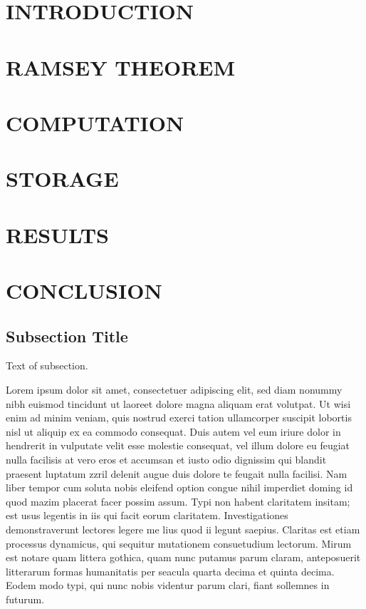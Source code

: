 \documentclass[12pt]{etsu_thesis}
\begin{document}
\listoffigures


\newpage
\section{INTRODUCTION}

\newpage
\section{RAMSEY THEOREM}

\newpage
\section{COMPUTATION}

\newpage
\section{STORAGE}

\newpage
\section{RESULTS}

\newpage
\section{CONCLUSION}


\subsection{Subsection Title}

Text of subsection.

Lorem ipsum dolor sit amet, consectetuer adipiscing elit, sed diam nonummy nibh euismod tincidunt ut laoreet dolore magna aliquam erat volutpat. Ut wisi enim ad minim veniam, quis nostrud exerci tation ullamcorper suscipit lobortis nisl ut aliquip ex ea commodo consequat. Duis autem vel eum iriure dolor in hendrerit in vulputate velit esse molestie consequat, vel illum dolore eu feugiat nulla facilisis at vero eros et accumsan et iusto odio dignissim qui blandit praesent luptatum zzril delenit augue duis dolore te feugait nulla facilisi. Nam liber tempor cum soluta nobis eleifend option congue nihil imperdiet doming id quod mazim placerat facer possim assum. Typi non habent claritatem insitam; est usus legentis in iis qui facit eorum claritatem. Investigationes demonstraverunt lectores legere me lius quod ii legunt saepius. Claritas est etiam processus dynamicus, qui sequitur mutationem consuetudium lectorum. Mirum est notare quam littera gothica, quam nunc putamus parum claram, anteposuerit litterarum formas humanitatis per seacula quarta decima et quinta decima. Eodem modo typi, qui nunc nobis videntur parum clari, fiant sollemnes in futurum.
\end{document}
